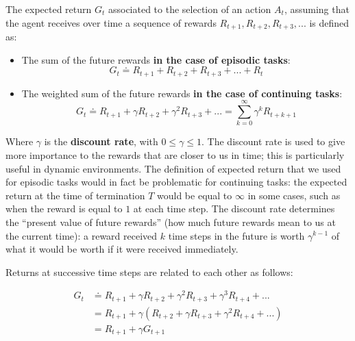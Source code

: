 The expected return $G_t$ associated to the selection of an action $A_t$, assuming that the agent receives over time a sequence of rewards $R_{t+1}, R_{t+2}, R_{t+3}, ...$ is defined as:

\begin{itemize}
    \item The sum of the future rewards \textbf{in the case of episodic tasks}:
    \begin{equation}
        G_t \doteq R_{t+1} + R_{t+2} + R_{t+3} + ... + R_t
        \label{eq:ch2-expectedreturn-episodic}
    \end{equation}
    \item The weighted sum of the future rewards \textbf{in the case of continuing tasks}:
    \begin{equation}
        G_t \doteq R_{t+1} + \gamma R_{t+2} + \gamma^2 R_{t+3} + ... = \sum_{k=0}^{\infty} \gamma^k R_{t+k+1}
        \label{eq:ch2-expectedreturn-continuous}
    \end{equation}
\end{itemize}

Where $\gamma$ is the \textbf{discount rate}, with $0 \le \gamma \le 1$. The discount rate is used to give more importance to the rewards that are closer to us in time; this is particularly useful in dynamic environments. The definition of expected return that we used for episodic tasks would in fact be problematic for continuing tasks: the expected return at the time of termination $T$ would be equal to $\infty$ in some cases, such as when the reward is equal to $1$ at each time step. The discount rate determines the ``present value of future rewards'' (how much future rewards mean to us at the current time): a reward received $k$ time steps in the future is worth $\gamma^{k-1}$ of what it would be worth if it were received immediately.

Returns at successive time steps are related to each other as follows:

\begin{equation*}
    \begin{split}
        G_t & \doteq R_{t+1} + \gamma R_{t+2} + \gamma^2 R_{t+3} + \gamma^3 R_{t+4} + ... \\
        & = R_{t+1} + \gamma \left( R_{t+2} + \gamma R_{t+3} + \gamma^2 R_{t+4} + ... \right) \\
        & = R_{t+1} + \gamma G_{t+1} \\
    \end{split}
\end{equation*}

